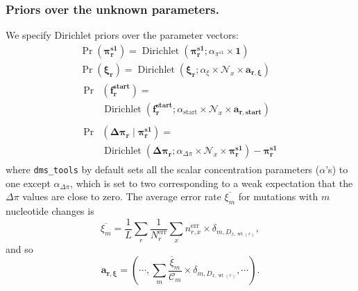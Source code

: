 \documentclass[twocolumn]{bmcart}%
\begin{document}
\subsubsection*{Priors over the unknown parameters.}
We specify Dirichlet priors over the parameter vectors:
\begin{gather}
\label{eq:pr_controlpir}
\Pr\left(\boldsymbol{\mathbf{\pi_r^{s1}}}\right) = \operatorname{Dirichlet}\left(\boldsymbol{\mathbf{\pi_r^{s1}}}; \alpha_{\pi^{s1}} \times \mathbf{1}\right) \\
\label{eq:pr_xir}
\Pr\left(\boldsymbol{\mathbf{\xi_r}}\right) = \operatorname{Dirichlet}\left( \boldsymbol{\mathbf{\xi_r}}; \alpha_{\xi} \times \mathcal{N}_x \times \boldsymbol{\mathbf{a_{r,\xi}}}\right) \\
\label{eq:pr_frstart}
\begin{split}
\Pr&\left(\boldsymbol{\mathbf{f_r^{\textbf{start}}}}\right) = \\ &\operatorname{Dirichlet}\left( \boldsymbol{\mathbf{f_r^{\textbf{start}}}}; \alpha_{\textrm{start}} \times \mathcal{N}_x \times \boldsymbol{\mathbf{a_{r,\textbf{start}}}}\right) \end{split} \\
\label{eq:pr_deltapi}
\begin{split}
\Pr&\left(\boldsymbol{\mathbf{\Delta\pi_r}} \mid \boldsymbol{\mathbf{\pi_r^{s1}}}\right) = \\& \operatorname{Dirichlet}\left(\boldsymbol{\mathbf{\Delta\pi_r}}; \alpha_{\Delta\pi} \times \mathcal{N}_x \times \boldsymbol{\mathbf{\pi_r^{s1}}}\right) - \boldsymbol{\mathbf{\pi_r^{s1}}} \end{split}
\end{gather}
where \texttt{dms\_tools} by default sets all the scalar concentration parameters ($\alpha$'s) to one except $\alpha_{\Delta\pi}$, which is set to two corresponding to a weak expectation that the $\Delta\pi$ values are close to zero. The average error rate $\overline{\xi_m}$ for mutations with $m$ nucleotide changes is 
\begin{equation}
\label{eq:avgxim}
\overline{\xi_m} = \frac{1}{L}\sum\limits_r \frac{1}{N_r^{\textrm{err}}}\sum\limits_{x} n_{r,x}^{\textrm{err}}\times \delta_{m,D_{x,\operatorname{wt}\left(r\right)}}, 
\end{equation}
and so
\begin{equation}
\label{eq:arxi}
\boldsymbol{\mathbf{a_{r,\xi}}} = \left(\cdots, \sum\limits_m \frac{\overline{\xi}_{m}}{\mathcal{C}_m} \times \delta_{m,D_{x,\operatorname{wt}\left(r\right)}},\cdots\right).
\end{equation}
\end{document}
